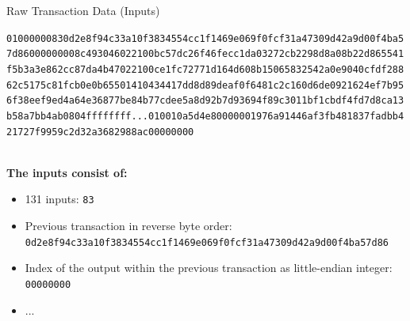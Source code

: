 \documentclass[handout]{beamer}
\begin{document}
\begin{frame}{Raw Transaction Data (Inputs)}
\begin{scriptsize}
\texttt{\textcolor{black!30}{01000000}{\alert<2>{83}\alert<3>{0d2e8f94c33a10f3834554cc1f1469e069f0fcf31a47309d42a9d00f4ba5
7d86}\alert<4>{00000000}}\textcolor{black!30}{8c493046022100bc57dc26f46fecc1da03272cb2298d8a08b22d865541
f5b3a3e862cc87da4b47022100ce1fc72771d164d608b15065832542a0e9040cfdf288
62c5175c81fcb0e0b65501410434417dd8d89deaf0f6481c2c160d6de0921624ef7b95
6f38eef9ed4a64e36877be84b77cdee5a8d92b7d93694f89c3011bf1cbdf4fd7d8ca13
b58a7bb4ab0804ffffffff...010010a5d4e80000001976a91446af3fb481837fadbb4
21727f9959c2d32a3682988ac00000000}}
\end{scriptsize}
\vspace{1em}
\scriptsize \\
\textbf{The inputs consist of:}\\
\begin{itemize}
	\item \alert<2>{131 inputs: \texttt{83}}
	\item \alert<3>{Previous transaction in reverse byte order: \texttt{0d2e8f94c33a10f3834554cc1f1469e069f0fcf31a47309d42a9d00f4ba57d86}}
	\item \alert<4>{Index of the output within the previous transaction as little-endian integer: \texttt{00000000}}
	\item ...
\end{itemize}
\end{frame}
\end{document}
